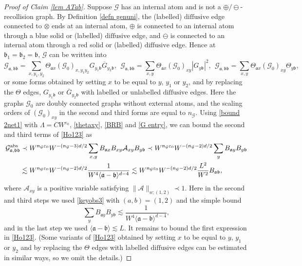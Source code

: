 \documentclass{article}
\newcommand{\1}{\mathds{1}}
\numberwithin{equation}{section}
\newcommand{\be}{\begin{equation}}
\newcommand{\ee}{\end{equation}}
\newcommand{\e}{{\varepsilon}}
\newcommand{\fa}{{\mathfrak a}}
\newcommand{\fb}{{\mathfrak b}}
\renewcommand{\cal}{\mathcal}
\newcommand{\dashed}{\text{diffusive}}
\theoremstyle{plain} %
\theoremstyle{remark}
\begin{document}
\begin{proof}[Proof of Claim \ref{lem ATab}]
\medskip
{} Suppose $\cal G$ has an internal atom and is not a $\oplus/\ominus$-recollision graph. By Definition \ref{defn genuni}, the (labelled) $\dashed$ edge connected to $\otimes$ ends at an internal atom, $\oplus$ is connected to an internal atom through a blue solid or (labelled) $\dashed$ edge, and $\ominus$ is connected to an internal atom through a red solid or (labelled) $\dashed$ edge. Hence at $\fb_1=\fb_2=\fb$, $\cal G$ can be written into %
\be\label{Ho123}
\cal G_{\fa,\fb\fb}= \sum_{x,y_1, y_2}{\Theta}_{ \fa x} (\cal G_0)_{x,y_1y_2} G_{y_1\fb}\overline G_{y_2\fb},\ \ \cal G_{{\fa,\fb\fb}}= \sum_{x,y}{\Theta}_{\fa x} (\cal G_0)_{x y} |G_{y\fb}|^2 ,\ \  \cal G_{\fa,\fb\fb}= \sum_{x,y}{\Theta}_{\fa x} (\cal G_0)_{xy}\Theta_{y\fb},\ee
or some forms obtained by setting $x$ to be equal to $y$, $y_1$ or $y_2$, and by replacing the $\Theta$ edges, $G_{y_1\fb}$ or $\overline G_{y_2\fb}$ with labelled or unlabelled $\dashed$ edges. Here the graphs $\cal G_0$ are doubly connected graphs without external atoms, and the scaling orders of $(\cal G_0)_{xy}$ in the second and third forms are equal to $n_{\cal G}$. Using \eqref{bound 2net1} with $\Lambda=CW^{\e_0}$, \eqref{thetaxy}, \eqref{BRB} and \eqref{G entry}, we can bound the second and third terms of \eqref{Ho123} as
\begin{align}
\cal G^{\rm abs}_{\fa,\fb\fb} &\prec  W^{n_{\cal G}\e_0}W^{-(n_{\cal G}-3)d/2}\sum_{x,y} B_{\fa x} B_{xy} \cal A_{xy}B_{y\fb} \prec W^{n_{\cal G}\e_0}W^{-(n_{\cal G}-2)d/2}\sum_{y} B_{\fa y}B_{y\fb} \nonumber\\
&\lesssim W^{n_{\cal G}\e_0}W^{-(n_{\cal G}-2)d/2} \frac{1}{W^4\langle \fa-\fb\rangle^{d-4}}\lesssim W^{n_{\cal G}\e_0}W^{-(n_{\cal G}-2)d/2}\frac{L^2}{W^2} B_{\fa\fb} , \label{calc1}
\end{align}
where $\cal A_{xy}$ is a positive variable satisfying $\|\cal A\|_{w;(1,2)}\prec 1$. Here in the second and third steps we used \eqref{keyobs3} with $(a,b)=(1,2)$ and the simple bound
$$ %
\sum_{y} B_{\fa y} B_{y\fb}\lesssim \frac{1}{W^4\langle \fa-\fb\rangle^{d-4}}, $$
and in the last step we used $\langle \fa-\fb\rangle\lesssim L$.
It remains to bound the first expression in \eqref{Ho123}. (Some variants of \eqref{Ho123} obtained by setting $x$ to be equal to $y$, $y_1$ or $y_2$ and by replacing the $\Theta$ edges with labelled $\dashed$ edges can be estimated in similar ways, so we omit the details.)



\end{proof}
\end{document}
